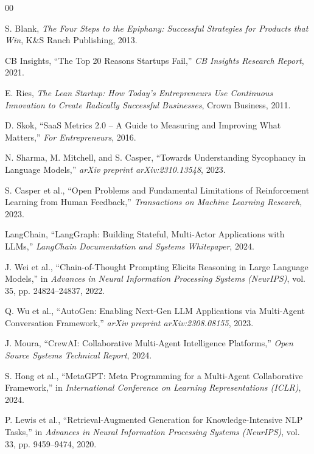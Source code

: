 \documentclass[conference]{IEEEtran}
\begin{document}
\begin{thebibliography}{00}

 S. Blank, \textit{The Four Steps to the Epiphany: Successful Strategies for Products that Win}, K\&S Ranch Publishing, 2013.

 CB Insights, ``The Top 20 Reasons Startups Fail,'' \textit{CB Insights Research Report}, 2021.

 E. Ries, \textit{The Lean Startup: How Today's Entrepreneurs Use Continuous Innovation to Create Radically Successful Businesses}, Crown Business, 2011.

 D. Skok, ``SaaS Metrics 2.0 -- A Guide to Measuring and Improving What Matters,'' \textit{For Entrepreneurs}, 2016.

 N. Sharma, M. Mitchell, and S. Casper, ``Towards Understanding Sycophancy in Language Models,'' \textit{arXiv preprint arXiv:2310.13548}, 2023.

 S. Casper et al., ``Open Problems and Fundamental Limitations of Reinforcement Learning from Human Feedback,'' \textit{Transactions on Machine Learning Research}, 2023.

 LangChain, ``LangGraph: Building Stateful, Multi-Actor Applications with LLMs,'' \textit{LangChain Documentation and Systems Whitepaper}, 2024.

 J. Wei et al., ``Chain-of-Thought Prompting Elicits Reasoning in Large Language Models,'' in \textit{Advances in Neural Information Processing Systems (NeurIPS)}, vol. 35, pp. 24824--24837, 2022.

 Q. Wu et al., ``AutoGen: Enabling Next-Gen LLM Applications via Multi-Agent Conversation Framework,'' \textit{arXiv preprint arXiv:2308.08155}, 2023.

 J. Moura, ``CrewAI: Collaborative Multi-Agent Intelligence Platforms,'' \textit{Open Source Systems Technical Report}, 2024.

 S. Hong et al., ``MetaGPT: Meta Programming for a Multi-Agent Collaborative Framework,'' in \textit{International Conference on Learning Representations (ICLR)}, 2024.

 P. Lewis et al., ``Retrieval-Augmented Generation for Knowledge-Intensive NLP Tasks,'' in \textit{Advances in Neural Information Processing Systems (NeurIPS)}, vol. 33, pp. 9459--9474, 2020.


\end{thebibliography}
\end{document}
